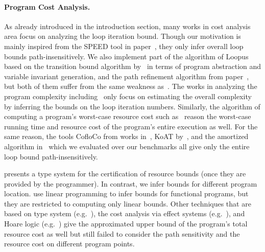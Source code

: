 \paragraph{Program Cost Analysis.}
As already introduced in the introduction section, many works in cost analysis area focus on analyzing the loop iteration bound.
Though our motivation is mainly inspired from the SPEED tool in paper~\cite{GulwaniZ10}, they only infer overall loop bounds path-insensitively.
We also implement part of the algorithm of Loopus based on the transition bound algorithm by~\cite{SinnZV17} in terms of program abstraction and variable invariant generation,
and the path refinement algorithm from paper~\cite{GulwaniJK09}, but both of them suffer from the same weakness as~\cite{GulwaniZ10}.
The works in analyzing the program complexity including~\cite{GustafssonEL05, HumenbergerJK18} only focus on estimating 
the overall complexity 
by inferring the bounds on the loop iteration numbers.
Similarly, the algorithm of computing a program's worst-case resource cost
such as~\cite{AlbertAGP08, AliasDFG10} reason the worst-case running time and resource cost of the program's entire execution as well.
For the same reason, the tools CofloCo from works in~\cite{Montoya17, Flores-MontoyaH14, Flores-Montoya16}, KoAT by~\cite{BrockschmidtEFFG16, BrockschmidtEFFG14, FalkeKS12, FalkeKS11}, and the amortized algorithm in~\cite{LuCT21} which we evaluated over our benchmarks all give only the entire loop bound path-insensitively.

\cite{CraryW00} presents a type system for the certification of resource bounds (once they are provided by the programmer). In contrast, we infer bounds for different program location. 
\cite{JostHLH10} use linear programming to infer bounds for functional programs, but they are restricted to computing only linear bounds.
Other techniques that are based on
type system (e.g.~\cite{CicekBG0H17, RajaniG0021}), the cost analysis via effect systems (e.g.~\cite{CicekBG0H17, RadicekBG0Z18, QuG019}), and Hoare logic (e.g.~\cite{CarbonneauxHS15})
give the approximated upper bound of the program's total resource cost as well but still failed to consider the path sensitivity and the resource cost on different program points.

